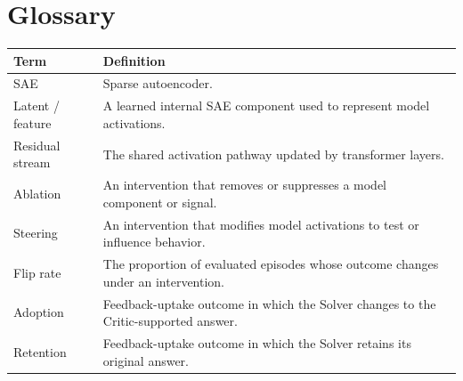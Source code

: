 \chapter*{Glossary}

\begin{longtable}{@{}p{}p{}@{}}
\toprule
Term & Definition \\
\midrule
\endhead
SAE & Sparse autoencoder. \\
Latent / feature & A learned internal SAE component used to represent model activations. \\
Residual stream & The shared activation pathway updated by transformer layers. \\
Ablation & An intervention that removes or suppresses a model component or signal. \\
Steering & An intervention that modifies model activations to test or influence behavior. \\
Flip rate & The proportion of evaluated episodes whose outcome changes under an intervention. \\
Adoption & Feedback-uptake outcome in which the Solver changes to the Critic-supported answer. \\
Retention & Feedback-uptake outcome in which the Solver retains its original answer. \\
\bottomrule
\end{longtable}
